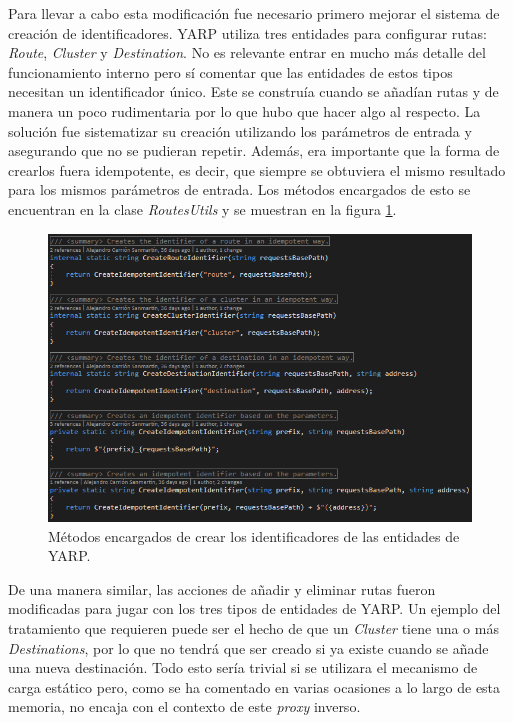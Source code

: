 \documentclass[11pt,spanish,listoffigures]{tfgetsinf}
\begin{document}
Para llevar a cabo esta modificación fue necesario primero mejorar el sistema de creación de identificadores. YARP utiliza tres entidades para configurar rutas: \emph{Route}, \emph{Cluster} y \emph{Destination}. No es relevante entrar en mucho más detalle del funcionamiento interno pero sí comentar que las entidades de estos tipos necesitan un identificador único. Este se construía cuando se añadían rutas y de manera un poco rudimentaria por lo que hubo que hacer algo al respecto. La solución fue sistematizar su creación utilizando los parámetros de entrada y asegurando que no se pudieran repetir. Además, era importante que la forma de crearlos fuera idempotente, es decir, que siempre se obtuviera el mismo resultado para los mismos parámetros de entrada. Los métodos encargados de esto se encuentran en la clase \emph{RoutesUtils} y se muestran en la figura \ref{creacionIdentificadores}.

\begin{figure}[ht]
\centering
\includegraphics[width=1\textwidth]{imagenes/creacionIdentificadores}
\caption{Métodos encargados de crear los identificadores de las entidades de YARP.}
	\label{creacionIdentificadores}
\end{figure}

De una manera similar, las acciones de añadir y eliminar rutas fueron modificadas para jugar con los tres tipos de entidades de YARP. Un ejemplo del tratamiento que requieren puede ser el hecho de que un \emph{Cluster} tiene una o más \emph{Destinations}, por lo que no tendrá que ser creado si ya existe cuando se añade una nueva destinación. Todo esto sería trivial si se utilizara el mecanismo de carga estático pero, como se ha comentado en varias ocasiones a lo largo de esta memoria, no encaja con el contexto de este \emph{proxy} inverso.
\end{document}
